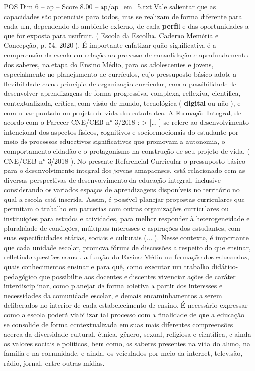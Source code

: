 \begin{textsample}{POS Dim 6 – ap – Score 8.00 – ap/ap\_em\_5.txt}
Vale salientar que as capacidades são potenciais para todos, mas se realizam de forma diferente para cada um, dependendo do ambiente externo, de cada \textbf{perfil} e das oportunidades a que for exposta para usufruir. ( Escola da Escolha.
Caderno Memória e Concepção, p. 54. 2020 ).
É importante enfatizar quão significativa é a compreensão da escola em relação ao processo de consolidação e aprofundamento dos saberes, na etapa do Ensino Médio, para os adolescentes e jovens, especialmente no planejamento de currículos, cujo pressuposto básico adote a flexibilidade como princípio de organização curricular, com a possibilidade de desenvolver aprendizagens de forma progressiva, complexa, reflexiva, científica, contextualizada, crítica, com visão de mundo, tecnológica ( \textbf{digital} ou não ), e com olhar pautado no projeto de vida dos estudantes.
A Formação Integral, de acordo com o Parecer CNE/CEB n{\EmojiFont °} 3/2018 : > [... ] se refere ao desenvolvimento intencional dos aspectos físicos, cognitivos e socioemocionais do estudante por meio de processos educativos significativos que promovam a autonomia, o comportamento cidadão e o protagonismo na construção de seu projeto de vida. ( CNE/CEB n{\EmojiFont °} 3/2018 ).
No presente Referencial Curricular o pressuposto básico para o desenvolvimento integral dos jovens amapaenses, está relacionado com as diversas perspectivas de desenvolvimento da educação integral, inclusive considerando os variados espaços de aprendizagens disponíveis no território no qual a escola está inserida.
Assim, é possível planejar propostas curriculares que permitam o trabalho em parcerias com outras organizações curriculares ou instituições para estudos e atividades, para melhor responder à heterogeneidade e pluralidade de condições, múltiplos interesses e aspirações dos estudantes, com suas especificidades etárias, sociais e culturais (... ).
Nesse contexto, é importante que cada unidade escolar, promova fóruns de discussões a respeito do que ensinar, refletindo questões como : a função do Ensino Médio na formação dos educandos, quais conhecimentos ensinar e para quê, como executar um trabalho didático-pedagógico que possibilite aos docentes e discentes vivenciar ações de caráter interdisciplinar, como planejar de forma coletiva a partir dos interesses e necessidades da comunidade escolar, e demais encaminhamentos a serem deliberados no interior de cada estabelecimento de ensino.
É necessário expressar como a escola poderá viabilizar tal processo com a finalidade de que a educação se consolide de forma contextualizada em suas mais diferentes compreensões acerca da diversidade cultural, étnica, gênero, sexual, religiosa e científica, e ainda os valores sociais e políticos, bem como, os saberes presentes na vida do aluno, na família e na comunidade, e ainda, os veiculados por meio da internet, televisão, rádio, jornal, entre outras mídias.

\end{textsample}
